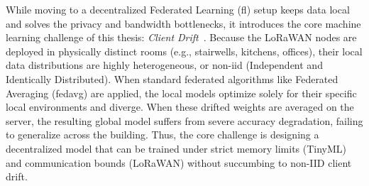 While moving to a decentralized Federated Learning (\gls{fl}) setup keeps data local and solves the privacy and bandwidth bottlenecks, it introduces the core machine learning challenge of this thesis: \emph{Client Drift}~\cite{ikram2026empirical}. Because the LoRaWAN nodes are deployed in physically distinct rooms (e.g., stairwells, kitchens, offices), their local data distributions are highly heterogeneous, or non-\gls{iid} (Independent and Identically Distributed). When standard federated algorithms like Federated Averaging (\gls{fedavg}) are applied, the local models optimize solely for their specific local environments and diverge. When these drifted weights are averaged on the server, the resulting global model suffers from severe accuracy degradation, failing to generalize across the building. Thus, the core challenge is designing a decentralized model that can be trained under strict memory limits (TinyML) and communication bounds (LoRaWAN) without succumbing to non-IID client drift.
